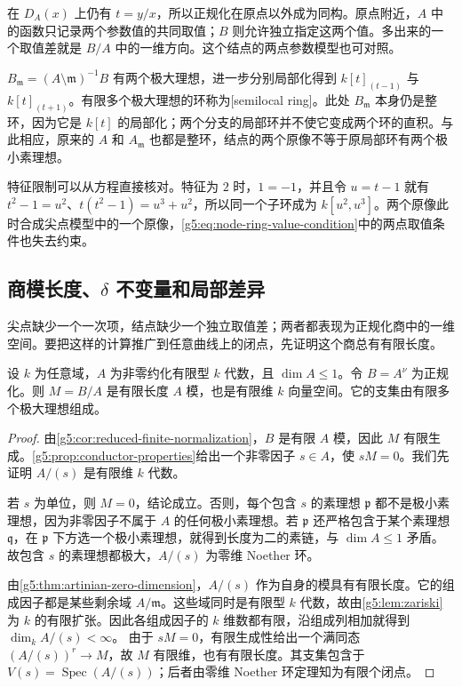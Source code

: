 在 \(D_A(x)\) 上仍有 \(t=y/x\)，所以正规化在原点以外成为同构。原点附近，\(A\) 中的函数只记录两个参数值的共同取值；\(B\) 则允许独立指定这两个值。多出来的一个取值差就是 \(B/A\) 中的一维方向。这个结点的两点参数模型也可对照\cite[第I章第4节，例4.9.1，第29--30页]{Hartshorne1977}。

\ProseParagraphBreak

\(B_{\mathfrak m}=(A\setminus\mathfrak m)^{-1}B\) 有两个极大理想，进一步分别局部化得到 \(k[t]_{(t-1)}\) 与 \(k[t]_{(t+1)}\)。有限多个极大理想的环称为[semilocal ring]。此处 \(B_{\mathfrak m}\) 本身仍是整环，因为它是 \(k[t]\) 的局部化；两个分支的局部环并不使它变成两个环的直积。与此相应，原来的 \(A\) 和 \(A_{\mathfrak m}\) 也都是整环，结点的两个原像不等于原局部环有两个极小素理想。

\ProseParagraphBreak

特征限制可以从方程直接核对。特征为 \(2\) 时，\(1=-1\)，并且令 \(u=t-1\) 就有 \(t^2-1=u^2\)、\(t(t^2-1)=u^3+u^2\)，所以同一个子环成为 \(k[u^2,u^3]\)。两个原像此时合成尖点模型中的一个原像，\eqref{g5:eq:node-ring-value-condition}中的两点取值条件也失去约束。

\subsection{\texorpdfstring{商模长度、\(\delta\) 不变量和局部差异}{商模长度、\GeometryPdfDelta{} 不变量和局部差异}}
\label{g5:subsec:0403:04}

尖点缺少一个一次项，结点缺少一个独立取值差；两者都表现为正规化商中的一维空间。要把这样的计算推广到任意曲线上的闭点，先证明这个商总有有限长度。

\begin{proposition}\label{g5:prop:curve-normalization-length}
	设 \(k\) 为任意域，\(A\) 为非零约化有限型 \(k\) 代数，且 \(\dim A\leq1\)。令 \(B=A^\nu\) 为正规化。则 \(M=B/A\) 是有限长度 \(A\) 模，也是有限维 \(k\) 向量空间。它的支集由有限多个极大理想组成。
\end{proposition}
\begin{proof}
	由\cref{g5:cor:reduced-finite-normalization}，\(B\) 是有限 \(A\) 模，因此 \(M\) 有限生成。\cref{g5:prop:conductor-properties}给出一个非零因子 \(s\in A\)，使 \(sM=0\)。我们先证明 \(A/(s)\) 是有限维 \(k\) 代数。

	若 \(s\) 为单位，则 \(M=0\)，结论成立。否则，每个包含 \(s\) 的素理想 \(\mathfrak p\) 都不是极小素理想，因为非零因子不属于 \(A\) 的任何极小素理想。若 \(\mathfrak p\) 还严格包含于某个素理想 \(\mathfrak q\)，在 \(\mathfrak p\) 下方选一个极小素理想，就得到长度为二的素链，与 \(\dim A\leq1\) 矛盾。故包含 \(s\) 的素理想都极大，\(A/(s)\) 为零维 Noether 环。

	由\cref{g5:thm:artinian-zero-dimension}，\(A/(s)\) 作为自身的模具有有限长度。它的组成因子都是某些剩余域 \(A/\mathfrak m\)。这些域同时是有限型 \(k\) 代数，故由\cref{g5:lem:zariski}为 \(k\) 的有限扩张。因此各组成因子的 \(k\) 维数都有限，沿组成列相加就得到 \(\dim_k A/(s)<\infty\)。
	由于 \(sM=0\)，有限生成性给出一个满同态 \((A/(s))^r\rightarrow M\)，故 \(M\) 有限维，也有有限长度。其支集包含于 \(V(s)=\operatorname{Spec}(A/(s))\)；后者由零维 Noether 环定理知为有限个闭点。
\end{proof}

